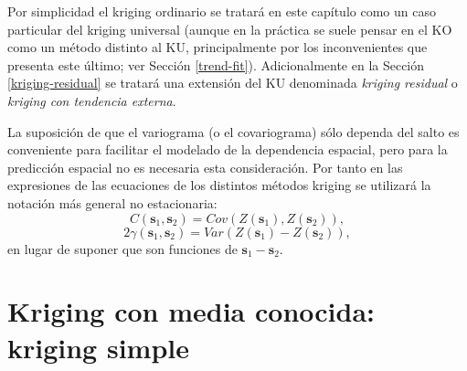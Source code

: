 \documentclass[
  spanish,
]{book}
\theoremstyle{break}
\theoremstyle{definition}
\theoremstyle{definition}
\theoremstyle{definition}
\theoremstyle{definition}
\theoremstyle{remark}
\begin{document}
Por simplicidad el kriging ordinario se tratará en este capítulo como un caso particular del kriging universal (aunque en la práctica se suele pensar en el KO como un método distinto al KU, principalmente por los inconvenientes que presenta este último; ver Sección \ref{trend-fit}).
Adicionalmente en la Sección \ref{kriging-residual} se tratará una extensión del KU denominada \emph{kriging residual} o \emph{kriging con tendencia externa}.

La suposición de que el variograma (o el covariograma) sólo dependa del salto es conveniente para facilitar el modelado de la dependencia espacial, pero para la predicción espacial no es necesaria esta consideración.
Por tanto en las expresiones de las ecuaciones de los distintos métodos kriging se utilizará la notación más general no estacionaria:
\[C(\mathbf{s}_{1}, \mathbf{s}_{2}) = Cov(Z(\mathbf{s}_{1}), Z(\mathbf{s}_{2})),\]
\[2\gamma(\mathbf{s}_{1}, \mathbf{s}_{2}) = Var(Z(\mathbf{s}_{1}) - Z(\mathbf{s}_{2})),\]
en lugar de suponer que son funciones de \(\mathbf{s}_{1}-\mathbf{s}_{2}\).

\hypertarget{ksimple}{%
\section{Kriging con media conocida: kriging simple}\label{ksimple}}
\end{document}
